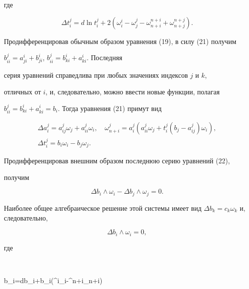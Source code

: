 где 


$$ 


\Delta t^j_i=d\ln t^j_i+2(\omega^i_i-\omega^j_j- 


\omega^{n+i}_{n+i}+\omega^{n+j}_{n+j}). 


$$ 


Продифференцировав обычным образом уравнения (19), в силу (21) получим 


$b^j_{ii}=a^i_{ji}+b^i_{ji}$, $b^j_{ii}=b^i_{ki}+a^i_{ki}$. Последняя 


серия уравнений справедлива при любых значениях индексов $j$ и $k$, 


отличных от $i$, и, следовательно, можно ввести новые функции, полагая 


$b^j_{ii}=b^i_{ki}+a^i_{ki}=b_i$. Тогда уравнения (21) примут вид 


\begin{equation} 


\begin{array}{c} 


\Delta a^j_i=a^j_{ij}\omega_j+a^j_{ii}\omega_i,\quad 


\omega^j_{n+i}=a^j_i(a^j_{ii}\omega_j+t^j_i(b_j-a^j_{ij}) 


\omega_i), \\[2mm] 


\Delta t^j_i=b_i\omega_i-b_j\omega_j. 


\end{array} 


\end{equation} 


Продифференцировав внешним образом последнюю серию уравнений (22), 


получим 


$$ 


\Delta b_i\wedge\omega_i-\Delta b_j\wedge\omega_j=0. 


$$ 


Наиболее общее алгебраическое решение этой системы имеет вид $\Delta 


b_k=c_k\omega_k$ и, следовательно, 


\begin{equation} 


\Delta b_i\wedge\omega_i=0, 


\end{equation} 


где 


$$ 


\Delta b_i=db_i+b_i(\omega^i_i-\omega^{n+i}_{n+i}) 


